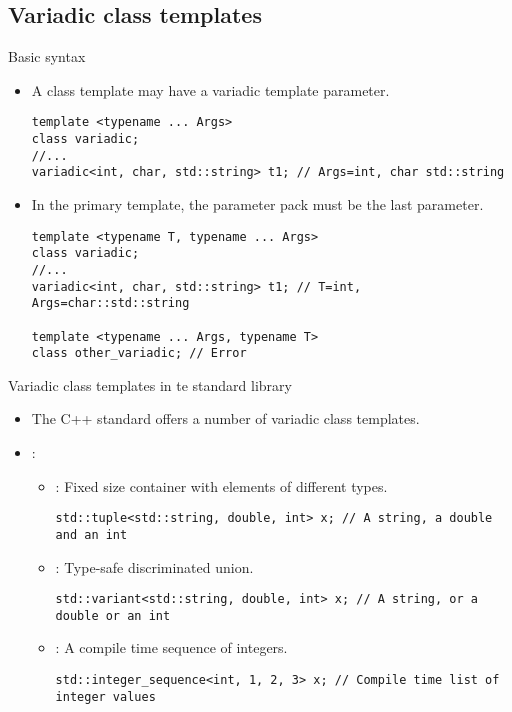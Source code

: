 \subsection{Variadic class templates}

\begin{frame}[t,fragile]{Basic syntax}
\begin{itemize}
  \item A class template may have a variadic template parameter.
\begin{lstlisting}
template <typename ... Args>
class variadic;
//...
variadic<int, char, std::string> t1; // Args=int, char std::string
\end{lstlisting}

  \item In the primary template, the parameter pack must be the last parameter.
\begin{lstlisting}
template <typename T, typename ... Args>
class variadic;
//...
variadic<int, char, std::string> t1; // T=int, Args=char::std::string

template <typename ... Args, typename T>
class other_variadic; // Error
\end{lstlisting}

\end{itemize}
\end{frame}

\begin{frame}[t,fragile]{Variadic class templates in te standard library}
\begin{itemize}
  \item The C++ standard offers a number of variadic class templates.

  \item {}:
    \begin{itemize}
      \item {}:
            Fixed size container with elements of different types.
\begin{lstlisting}
std::tuple<std::string, double, int> x; // A string, a double and an int
\end{lstlisting}

      \item {}:
            Type-safe discriminated union.
\begin{lstlisting}
std::variant<std::string, double, int> x; // A string, or a double or an int
\end{lstlisting}

      \item {}:
            A compile time sequence of integers.
\begin{lstlisting}
std::integer_sequence<int, 1, 2, 3> x; // Compile time list of integer values
\end{lstlisting}
    \end{itemize}
\end{itemize}
\end{frame}

